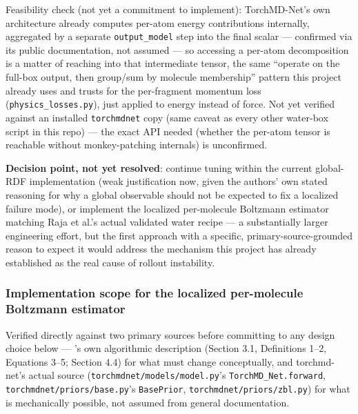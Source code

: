 \documentclass[11pt]{article}
\begin{document}
Feasibility check (not yet a commitment to implement): TorchMD-Net's own
architecture already computes per-atom energy contributions internally,
aggregated by a separate \texttt{output\_model} step into the final scalar
--- confirmed via its public documentation, not assumed --- so accessing a
per-atom decomposition is a matter of reaching into that intermediate
tensor, the same ``operate on the full-box output, then group/sum by
molecule membership'' pattern this project already uses and trusts for the
per-fragment momentum loss (\texttt{physics\_losses.py}), just applied to
energy instead of force. Not yet verified against an installed
\texttt{torchmdnet} copy (same caveat as every other water-box script in
this repo) --- the exact API needed (whether the per-atom tensor is
reachable without monkey-patching internals) is unconfirmed.

\textbf{Decision point, not yet resolved}: continue tuning within the
current global-RDF implementation (weak justification now, given the
authors' own stated reasoning for why a global observable should not be
expected to fix a localized failure mode), or implement the localized
per-molecule Boltzmann estimator matching Raja et al.'s actual validated
water recipe --- a substantially larger engineering effort, but the first
approach with a specific, primary-source-grounded reason to expect it
would address the mechanism this project has already established as the
real cause of rollout instability.

\subsubsection{Implementation scope for the localized per-molecule Boltzmann estimator}
\label{sec:q4-stable-local-estimator-scope}

Verified directly against two primary sources before committing to any
design choice below --- \citet{raja2025stable}'s own algorithmic
description (Section 3.1, Definitions 1--2, Equations 3--5; Section 4.4)
for what must change conceptually, and torchmd-net's actual source
\citep{torchmdnet-code} (\texttt{torchmdnet/models/model.py}'s
\texttt{TorchMD\_Net.forward}, \texttt{torchmdnet/priors/base.py}'s
\texttt{BasePrior}, \texttt{torchmdnet/priors/zbl.py}) for what is
mechanically possible, not assumed from general documentation.
\end{document}
